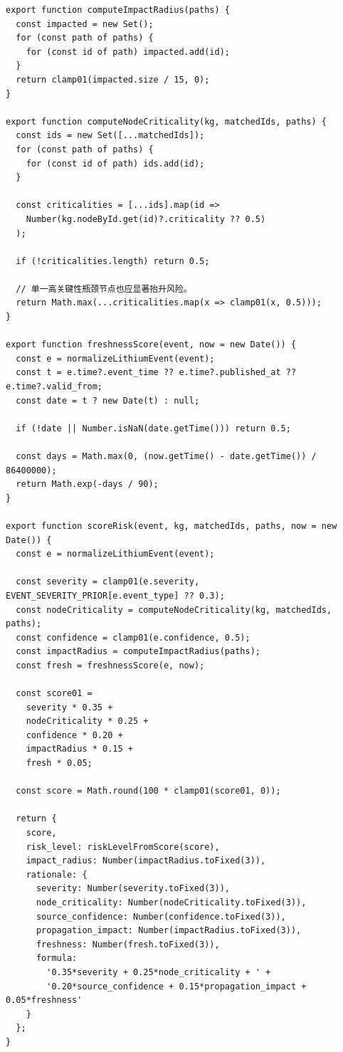 ﻿\documentclass[12pt,a4paper]{article}
\begin{document}
\begin{lstlisting}[style=projectcode,caption={图增强可解释风险评分实现}]
export function computeImpactRadius(paths) {
  const impacted = new Set();
  for (const path of paths) {
    for (const id of path) impacted.add(id);
  }
  return clamp01(impacted.size / 15, 0);
}

export function computeNodeCriticality(kg, matchedIds, paths) {
  const ids = new Set([...matchedIds]);
  for (const path of paths) {
    for (const id of path) ids.add(id);
  }

  const criticalities = [...ids].map(id =>
    Number(kg.nodeById.get(id)?.criticality ?? 0.5)
  );

  if (!criticalities.length) return 0.5;

  // 单一高关键性瓶颈节点也应显著抬升风险。
  return Math.max(...criticalities.map(x => clamp01(x, 0.5)));
}

export function freshnessScore(event, now = new Date()) {
  const e = normalizeLithiumEvent(event);
  const t = e.time?.event_time ?? e.time?.published_at ?? e.time?.valid_from;
  const date = t ? new Date(t) : null;

  if (!date || Number.isNaN(date.getTime())) return 0.5;

  const days = Math.max(0, (now.getTime() - date.getTime()) / 86400000);
  return Math.exp(-days / 90);
}

export function scoreRisk(event, kg, matchedIds, paths, now = new Date()) {
  const e = normalizeLithiumEvent(event);

  const severity = clamp01(e.severity, EVENT_SEVERITY_PRIOR[e.event_type] ?? 0.3);
  const nodeCriticality = computeNodeCriticality(kg, matchedIds, paths);
  const confidence = clamp01(e.confidence, 0.5);
  const impactRadius = computeImpactRadius(paths);
  const fresh = freshnessScore(e, now);

  const score01 =
    severity * 0.35 +
    nodeCriticality * 0.25 +
    confidence * 0.20 +
    impactRadius * 0.15 +
    fresh * 0.05;

  const score = Math.round(100 * clamp01(score01, 0));

  return {
    score,
    risk_level: riskLevelFromScore(score),
    impact_radius: Number(impactRadius.toFixed(3)),
    rationale: {
      severity: Number(severity.toFixed(3)),
      node_criticality: Number(nodeCriticality.toFixed(3)),
      source_confidence: Number(confidence.toFixed(3)),
      propagation_impact: Number(impactRadius.toFixed(3)),
      freshness: Number(fresh.toFixed(3)),
      formula:
        '0.35*severity + 0.25*node_criticality + ' +
        '0.20*source_confidence + 0.15*propagation_impact + 0.05*freshness'
    }
  };
}


\end{lstlisting}
\end{document}
